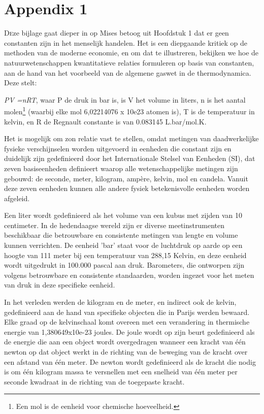 \hypertarget{appendix-1}{%
\chapter{Appendix 1}\label{appendix-1}}

\lettrine{D}eze bijlage gaat dieper in op Mises\textquotesingle{} betoog uit Hoofdstuk 1 dat er geen constanten zijn in het menselijk handelen. Het is een diepgaande kritiek op de methoden van de moderne economie, en om dat te illustreren, bekijken we hoe de natuurwetenschappen kwantitatieve relaties formuleren op basis van constanten, aan de hand van het voorbeeld van de algemene gaswet in de thermodynamica. Deze stelt:

\emph{PV =nRT}, waar P de druk in bar is, is V het volume in liters, n is het aantal molen\footnote{Een mol is de eenheid voor chemische hoeveelheid.} (waarbij elke mol 6,02214076 x 10e23 atomen is), T is de temperatuur in kelvin, en R de Regnault constante is van 0.083145 L.bar/mol.K.

Het is mogelijk om zo\textquotesingle n relatie vast te stellen, omdat metingen van daadwerkelijke fysieke verschijnselen worden uitgevoerd in eenheden die constant zijn en duidelijk zijn gedefinieerd door het Internationale Stelsel van Eenheden (SI), dat zeven basiseenheden definieert waarop alle wetenschappelijke metingen zijn gebouwd: de seconde, meter, kilogram, ampère, kelvin, mol en candela. Vanuit deze zeven eenheden kunnen alle andere fysiek betekenisvolle eenheden worden afgeleid.

Een liter wordt gedefinieerd als het volume van een kubus met zijden van 10 centimeter. In de hedendaagse wereld zijn er diverse meetinstrumenten beschikbaar die betrouwbare en consistente metingen van lengte en volume kunnen verrichten. De eenheid 'bar' staat voor de luchtdruk op aarde op een hoogte van 111 meter bij een temperatuur van 288,15 Kelvin, en deze eenheid wordt uitgedrukt in 100.000 pascal aan druk. Barometers, die ontworpen zijn volgens betrouwbare en consistente standaarden, worden ingezet voor het meten van druk in deze specifieke eenheid.

In het verleden werden de kilogram en de meter, en indirect ook de kelvin, gedefinieerd aan de hand van specifieke objecten die in Parijs werden bewaard. Elke graad op de kelvinschaal komt overeen met een verandering in thermische energie van 1,380649x10e-23 joules. De joule wordt op zijn beurt gedefinieerd als de energie die aan een object wordt overgedragen wanneer een kracht van één newton op dat object werkt in de richting van de beweging van de kracht over een afstand van één meter. De newton wordt gedefinieerd als de kracht die nodig is om één kilogram massa te versnellen met een snelheid van één meter per seconde kwadraat in de richting van de toegepaste kracht.

